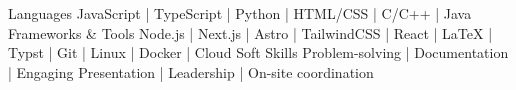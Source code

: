 \begin{cvskills}
  \cvskill
    {Languages} %
    {JavaScript | TypeScript | Python | HTML/CSS | C/C++ | Java}
    \cvskill
    {Frameworks \& Tools}
    {Node.js | Next.js | Astro | TailwindCSS | React | LaTeX | Typst | Git | Linux | Docker | Cloud}
  \cvskill
    {Soft Skills} %
    {Problem-solving | Documentation | Engaging Presentation | Leadership | On-site coordination} %
\end{cvskills}

